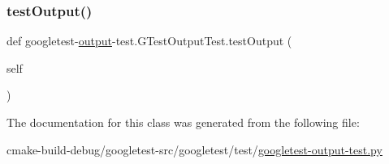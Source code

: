 \mbox{\label{classgoogletest-output-test_1_1GTestOutputTest_a4ab77925377e6c837d33f07960a31212}} 
\subsubsection{\texorpdfstring{testOutput()}{testOutput()}}
{\footnotesize\ttfamily def googletest-\/\mbox{\hyperlink{namespacegoogletest-output-test_ab3df9ce09186215a36c30454cf282417}{output}}-\/test.\+G\+Test\+Output\+Test.\+test\+Output (\begin{DoxyParamCaption}\item[{}]{self }\end{DoxyParamCaption})}



The documentation for this class was generated from the following file\+:\begin{DoxyCompactItemize}
\item 
cmake-\/build-\/debug/googletest-\/src/googletest/test/\mbox{\hyperlink{googletest-output-test_8py}{googletest-\/output-\/test.\+py}}\end{DoxyCompactItemize}
